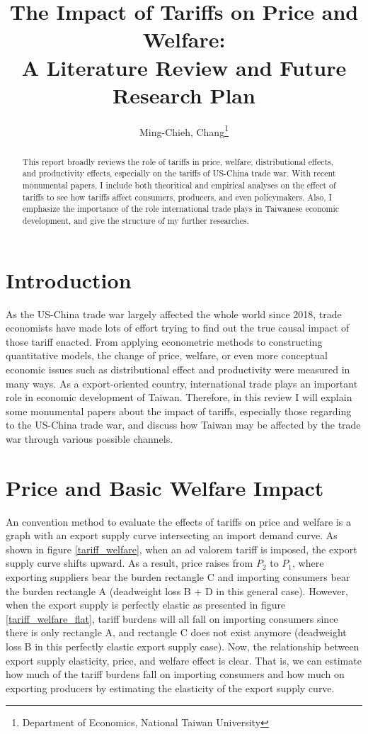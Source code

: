 \documentclass[12pt]{article}
\title{The Impact of Tariffs on Price and Welfare: \\ A Literature Review and Future Research Plan}
\author{Ming-Chieh, Chang\thanks{Department of Economics, National Taiwan University}}
\begin{document}
\maketitle

\begin{abstract}
This report broadly reviews the role of tariffs in price, welfare, distributional effects, and productivity effects, especially on the tariffs of US-China trade war.
With recent monumental papers, I include both theoritical and empirical analyses on the effect of tariffs to see how tariffs affect consumers, producers, and even policymakers.
Also, I emphasize the importance of the role international trade plays in Taiwanese economic development, and give the structure of my further researches.
\end{abstract}

\section{Introduction}
\label{sec:intro}
As the US-China trade war largely affected the whole world since 2018, 
trade economists have made lots of effort trying to find out the true causal impact of those tariff enacted. 
From applying econometric methods to constructing quantitative models, 
the change of price, welfare, or even more conceptual economic issues such as distributional effect and productivity were measured in many ways.
As a export-oriented country, international trade plays an important role in economic development of Taiwan.
Therefore, in this review I will explain some monumental papers about the impact of tariffs, 
especially those regarding to the US-China trade war, and discuss how Taiwan may be affected by the trade war through various possible channels.

\section{Price and Basic Welfare Impact}
\label{sec:price, welfare}
An convention method to evaluate the effects of tariffs on price and welfare is a graph with an export supply curve intersecting an import demand curve. \cite{amiti2019impact}
As shown in figure \ref{tariff_welfare}, when an ad valorem tariff is imposed, the export supply curve shifts upward. 
As a result, price raises from $P_2$ to $P_1$, where exporting suppliers bear the burden rectangle C and importing consumers bear the burden rectangle A 
(deadweight loss B + D in this general case).
However, when the export supply is perfectly elastic as presented in figure \ref{tariff_welfare_flat}, 
tariff burdens will all fall on importing consumers since there is only rectangle A, and rectangle C does not exist anymore 
(deadweight loss B in this perfectly elastic export supply case).
Now, the relationship between export supply elasticity, price, and welfare effect is clear. 
That is, we can estimate how much of the tariff burdens fall on importing consumers and how much on exporting producers by estimating the elasticity of the export supply curve.
\end{document}
